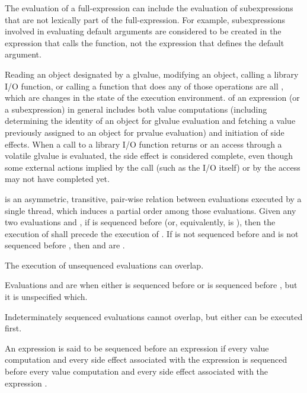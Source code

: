 \pnum
\begin{note}
The evaluation of a full-expression can include the
evaluation of subexpressions that are not lexically part of the
full-expression. For example, subexpressions involved in evaluating
default arguments are considered to
be created in the expression that calls the function, not the expression
that defines the default argument.
\end{note}

\pnum
{}%
Reading an object designated by a 
glvalue, modifying an object, calling a library I/O
function, or calling a function that does any of those operations are
all
, which are changes in the state of the execution
environment.  of an expression (or a
subexpression) in general includes both value computations (including
determining the identity of an object for glvalue evaluation and fetching
a value previously assigned to an object for prvalue evaluation) and
initiation of side effects. When a call to a library I/O function
returns or an access through a volatile glvalue is evaluated, the side
effect is considered complete, even though some external actions implied
by the call (such as the I/O itself) or by the  access
may not have completed yet.

\pnum
{} is an asymmetric, transitive, pair-wise relation between
evaluations executed by a single thread, which induces
a partial order among those evaluations. Given any two evaluations  and
, if  is sequenced before 
(or, equivalently,  is  ),
then the execution of
 shall precede the execution of . If  is not sequenced
before  and  is not sequenced before , then  and
 are .
\begin{note}
The execution of unsequenced
evaluations can overlap.
\end{note}
Evaluations  and  are
 when either  is sequenced before
 or  is sequenced before , but it is unspecified which.
\begin{note}
Indeterminately sequenced evaluations cannot overlap, but either
can be executed first.
\end{note}
An expression 
is said to be sequenced before
an expression  if
every value computation and every side effect
associated with the expression 
is sequenced before
every value computation and every side effect
associated with the expression .

